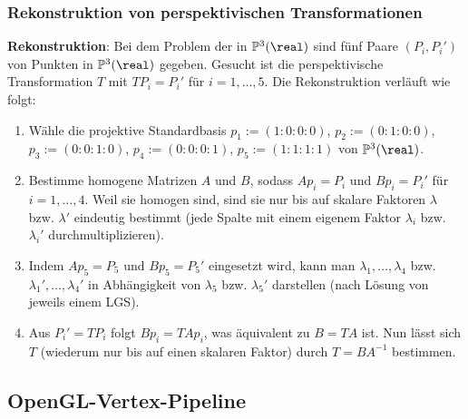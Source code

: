 \pagebreak

\subsubsection{%
    Rekonstruktion von perspektivischen Transformationen%
}

\textbf{Rekonstruktion}:
Bei dem Problem der 
in $\PP^3(\real)$ sind fünf Paare $(P_i, P_i')$ von Punkten in $\PP^3(\real)$ gegeben.
Gesucht ist die perspektivische Transformation $T$ mit $TP_i = P_i'$ für $i = 1, \dotsc, 5$.
Die Rekonstruktion verläuft wie folgt:
\begin{enumerate}
    \item
    Wähle die projektive Standardbasis $p_1 := (1:0:0:0)$, $p_2 := (0:1:0:0)$,\\
    $p_3 := (0:0:1:0)$, $p_4 := (0:0:0:1)$, $p_5 := (1:1:1:1)$ von $\PP^3(\real)$.

    \item
    Bestimme homogene Matrizen $A$ und $B$, sodass $Ap_i = P_i$ und $Bp_i = P_i'$ für
    $i = 1, \dotsc, 4$.
    Weil sie homogen sind, sind sie nur bis auf skalare Faktoren $\lambda$ bzw. $\lambda'$
    eindeutig bestimmt
    (jede Spalte mit einem eigenem Faktor $\lambda_i$ bzw. $\lambda_i'$ durchmultiplizieren).

    \item
    Indem $Ap_5 = P_5$ und $Bp_5 = P_5'$ eingesetzt wird, kann man $\lambda_1, \dotsc, \lambda_4$
    bzw. $\lambda_1', \dotsc, \lambda_4'$ in Abhängigkeit von $\lambda_5$ bzw. $\lambda_5'$
    darstellen (nach Lösung von jeweils einem LGS).

    \item
    Aus $P_i' = TP_i$ folgt $Bp_i = TAp_i$, was äquivalent zu $B = TA$ ist.
    Nun lässt sich $T$ (wiederum nur bis auf einen skalaren Faktor)
    durch $T = BA^{-1}$ bestimmen.
\end{enumerate}

\subsection{%
    OpenGL-Vertex-Pipeline%
}


